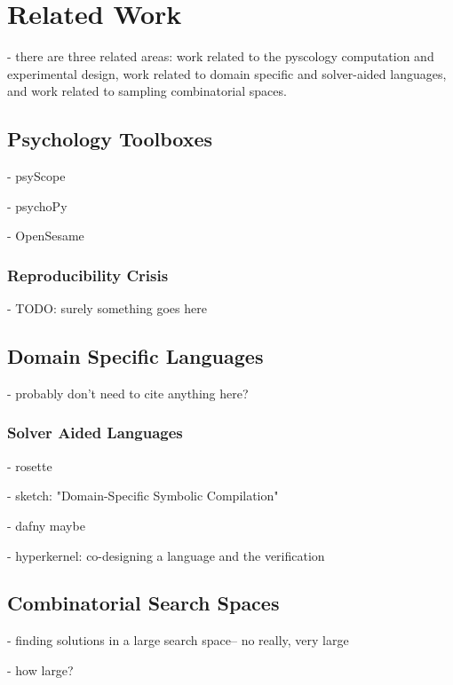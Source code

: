 
\chapter{Related Work}

- there are three related areas: work related to the pyscology computation and experimental design, work related to domain specific and solver-aided languages, and work related to sampling combinatorial spaces. 


\section{Psychology Toolboxes}

- psyScope \cite{cohen1993psyscope}

- psychoPy \cite{mathot2012opensesame}

- OpenSesame \cite{peirce2009generating}

\subsection{Reproducibility Crisis}

- TODO: surely something goes here

\section{Domain Specific Languages}

- probably don't need to cite anything here?

\subsection{Solver Aided Languages}

- rosette \cite{torlak2014lightweight}

- sketch: "Domain-Specific Symbolic Compilation"

- dafny maybe

- hyperkernel: co-designing a language and the verification


\section{Combinatorial Search Spaces}

- finding solutions in a large search space-- no really, very large

- how large?

